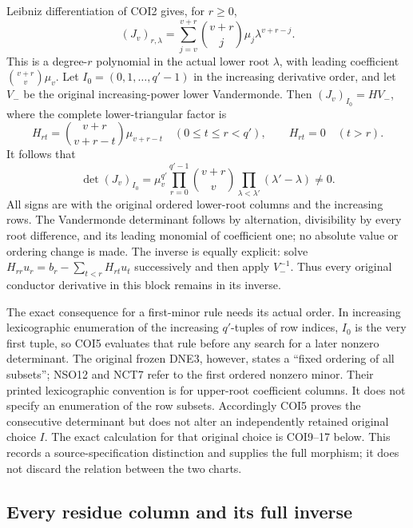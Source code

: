 \documentclass[11pt,a4paper]{article}
\begin{document}
Leibniz differentiation of COI2 gives, for $r\ge0$,
\[
 (J_v)_{r,\lambda}
       =\sum_{j=v}^{v+r}\binom{v+r}{j}\mu_j\lambda^{v+r-j}.
 \tag{COI3}
\]
This is a degree-$r$ polynomial in the actual lower root $\lambda$,
with leading coefficient $\binom{v+r}{v}\mu_v$.
Let $I_0=(0,1,\ldots,q'-1)$ in the increasing derivative order,
and let $V_-$ be the original increasing-power lower Vandermonde.
Then $(J_v)_{I_0}=HV_-$, where the complete lower-triangular factor is
\[
 H_{rt}=\binom{v+r}{v+r-t}\mu_{v+r-t}\quad(0\le t\le r<q'),
 \qquad H_{rt}=0\quad(t>r).
 \tag{COI4}
\]
It follows that
\[
 \det(J_v)_{I_0}
  =\mu_v^{q'}\prod_{r=0}^{q'-1}\binom{v+r}{v}
       \prod_{\lambda<\lambda'}(\lambda'-\lambda)\ne0.
 \tag{COI5}
\]
All signs are with the original ordered lower-root columns and the
increasing rows. The Vandermonde determinant follows by alternation,
divisibility by every root difference, and its leading monomial of
coefficient one; no absolute value or ordering change is made.
The inverse is equally explicit: solve
$H_{rr}u_r=b_r-\sum_{t<r}H_{rt}u_t$ successively and then
apply $V_-^{-1}$. Thus every original conductor derivative in this
block remains in its inverse.

The exact consequence for a first-minor rule needs its actual order.
In increasing lexicographic enumeration of the increasing $q'$-tuples
of row indices, $I_0$ is the very first tuple, so COI5 evaluates that
rule before any search for a later nonzero determinant.
The original frozen DNE3, however, states a ``fixed ordering of all
subsets''; NSO12 and NCT7 refer to the first ordered nonzero minor.
Their printed lexicographic convention is for upper-root coefficient
columns. It does not specify an enumeration of the row subsets.
Accordingly COI5 proves the consecutive determinant but does not
alter an independently retained original choice $I$.
The exact calculation for that original choice is COI9--17 below.
This records a source-specification distinction and supplies the full
morphism; it does not discard the relation between the two charts.

\subsection{Every residue column and its full inverse}
\end{document}
